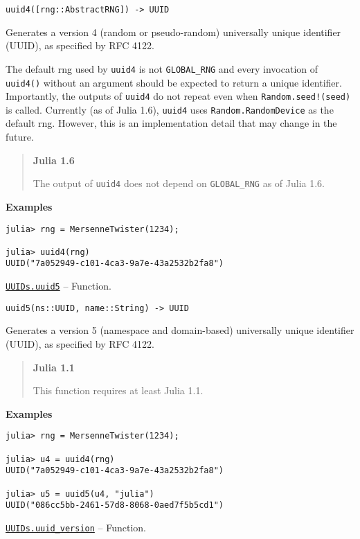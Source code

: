 \begin{adjustwidth}{2em}{0pt}


\begin{verbatim}
uuid4([rng::AbstractRNG]) -> UUID
\end{verbatim}

Generates a version 4 (random or pseudo-random) universally unique identifier (UUID), as specified by RFC 4122.

The default rng used by \texttt{uuid4} is not \texttt{GLOBAL\_RNG} and every invocation of \texttt{uuid4()} without an argument should be expected to return a unique identifier. Importantly, the outputs of \texttt{uuid4} do not repeat even when \texttt{Random.seed!(seed)} is called. Currently (as of Julia 1.6), \texttt{uuid4} uses \texttt{Random.RandomDevice} as the default rng. However, this is an implementation detail that may change in the future.

\begin{quote}
\textbf{Julia 1.6}

The output of \texttt{uuid4} does not depend on \texttt{GLOBAL\_RNG} as of Julia 1.6.

\end{quote}
\textbf{Examples}


\begin{verbatim}
julia> rng = MersenneTwister(1234);

julia> uuid4(rng)
UUID("7a052949-c101-4ca3-9a7e-43a2532b2fa8")
\end{verbatim}



\end{adjustwidth}
\hypertarget{16798189732863707215}{}
\hyperlink{16798189732863707215}{\texttt{UUIDs.uuid5}}  -- {Function.}

\begin{adjustwidth}{2em}{0pt}


\begin{verbatim}
uuid5(ns::UUID, name::String) -> UUID
\end{verbatim}

Generates a version 5 (namespace and domain-based) universally unique identifier (UUID), as specified by RFC 4122.

\begin{quote}
\textbf{Julia 1.1}

This function requires at least Julia 1.1.

\end{quote}
\textbf{Examples}


\begin{verbatim}
julia> rng = MersenneTwister(1234);

julia> u4 = uuid4(rng)
UUID("7a052949-c101-4ca3-9a7e-43a2532b2fa8")

julia> u5 = uuid5(u4, "julia")
UUID("086cc5bb-2461-57d8-8068-0aed7f5b5cd1")
\end{verbatim}



\end{adjustwidth}
\hypertarget{2328416264059500569}{}
\hyperlink{2328416264059500569}{\texttt{UUIDs.uuid\_version}}  -- {Function.}

